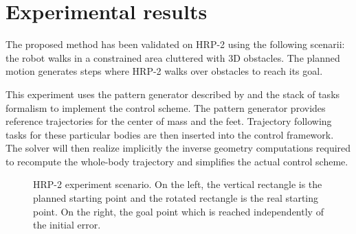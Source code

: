 \section{Experimental results}
\label{exp}


The proposed method has been validated on HRP-2 using the following
scenarii: the robot walks in a constrained area cluttered with 3D
obstacles. The planned motion generates steps where HRP-2 walks over
obstacles to reach its goal.


This experiment uses the pattern generator described by
\cite{10icra.perrin} and the stack of tasks formalism
\cite{09icar.mansard} to implement the control scheme. The pattern
generator provides reference trajectories for the center of mass and
the feet. Trajectory following tasks for these particular bodies are
then inserted into the control framework. The solver will then realize
implicitly the inverse geometry computations required to recompute the
whole-body trajectory and simplifies the actual control scheme.


\begin{figure}[ht!]
  \begin{center}
  \end{center}
  \caption{HRP-2 experiment scenario. On the left, the vertical
    rectangle is the planned starting point and the rotated rectangle
    is the real starting point. On the right, the goal point which is
    reached independently of the initial error. \label{fig:scenario}}
\end{figure}


